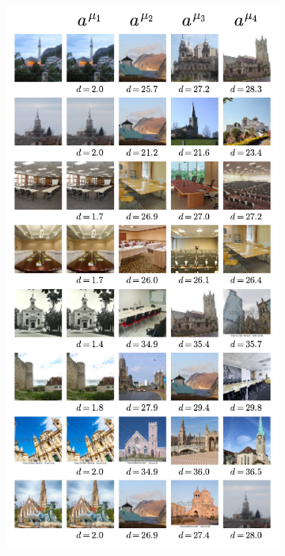 \documentclass[10pt,twocolumn]{article}
\begin{document}
\begin{figure}[!htb]
\begin{subfigure}{.5\textwidth}
    \centering
    \includegraphics[width=.9\linewidth]{Figures_SM/Collapse_LSUN_100.pdf}
    \caption{}
    \label{fig:Collapse_LSUN_200}
\end{subfigure} \quad
\begin{subfigure}{.5\textwidth}
    \centering

\end{subfigure}
\end{figure}
\end{document}

